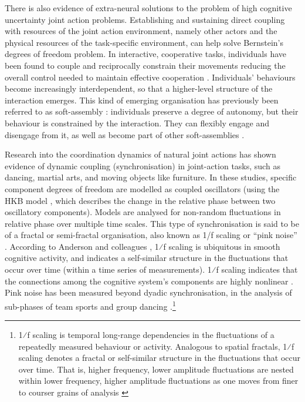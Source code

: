 \begin{CJK}{UTF8}{gbsn}
There is also evidence of extra-neural solutions to the problem of high cognitive uncertainty joint action problems. Establishing and sustaining direct coupling with resources of the joint action environment, namely other actors and the physical resources of the task-specific environment, can help solve Bernstein's degrees of freedom problem.   In interactive, cooperative tasks, individuals have been found to couple and reciprocally constrain their movements reducing the overall control needed to maintain effective cooperation \citep{Ramenzoni2011,Ramenzoni2012,Riley2011,Schmidt1990}.  Individuals’ behaviours become increasingly interdependent, so that a higher-level structure of the interaction emerges. This kind of emerging organisation has previously been referred to as soft-assembly \citep{Kello2009}: individuals preserve a degree of autonomy, but their behaviour is constrained by the interaction. They can flexibly engage and disengage from it, as well as become part of other soft-assemblies \citep{DeJaegher2010,DiPaolo2012}.

Research into the coordination dynamics of natural joint actions  has shown evidence of dynamic coupling (synchronisation) in joint-action tasks, such as dancing, martial arts, and moving objects like furniture.  In these studies, specific component degrees of freedom are modelled as coupled oscillators (using the HKB model \citep{Haken1985,Kelso1986}, which describes the change in the relative phase between two oscillatory components).  Models are analysed for non-random fluctuations in relative phase over multiple time scales.  This type of synchronisation is said to be of a fractal or semi-fractal organisation, also known as 1/f scaling or ``pink noise'' \citep{Caron2017}. According to Anderson and colleagues \citep{Anderson2012}, 1⁄f scaling is ubiquitous in smooth cognitive activity, and indicates a self-similar structure in the fluctuations that occur over time (within a time series of measurements).
1⁄f scaling indicates that the connections among the cognitive system's components are highly nonlinear \citep{Ding2002,Holden2013,Kello2010,Riley2011,VanOrden2003,VanOrden2005}. Pink noise has been measured beyond dyadic synchronisation, in the analysis of sub-phases of team sports \citep{Passos2014,Duarte2012} and group dancing \citep{Chauvigne2017}.\footnote{1⁄f scaling is temporal long-range dependencies in the fluctuations of a repeatedly measured behaviour or activity. Analogous to spatial fractals, 1⁄f scaling denotes a fractal or self-similar structure in the fluctuations that occur over time. That is, higher frequency, lower amplitude fluctuations are nested within lower frequency, higher amplitude fluctuations as one moves from finer to courser grains of analysis \cites(for a more detailed description see, for example)(){Holden2005}{Kello2009}}


\end{CJK}
